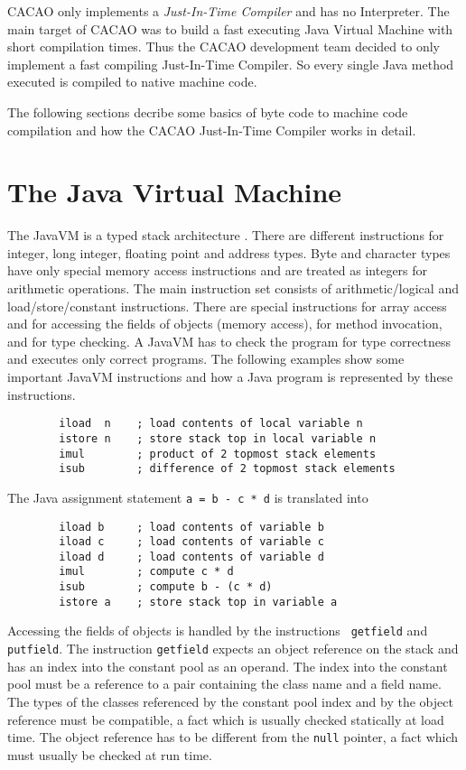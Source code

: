 CACAO only implements a \textit{Just-In-Time Compiler} and has no
Interpreter. The main target of CACAO was to build a fast executing
Java Virtual Machine with short compilation times. Thus the CACAO
development team decided to only implement a fast compiling
Just-In-Time Compiler. So every single Java method executed is
compiled to native machine code.

The following sections decribe some basics of byte code to machine
code compilation and how the CACAO Just-In-Time Compiler works in
detail.


\section{The Java Virtual Machine}

The JavaVM is a typed stack architecture \cite{javavm96}. There are
different instructions for integer, long integer, floating point and
address types. Byte and character types have only special memory access
instructions and are treated as integers for arithmetic operations. The
main instruction set consists of arithmetic/logical and load/store/constant
instructions. There are special instructions for array access and for
accessing the fields of objects (memory access), for method invocation,
and  for type checking. A JavaVM has to check the program for type
correctness and executes only correct programs. The following examples show
some important JavaVM instructions and how a Java program is represented by
these instructions.

\begin{verbatim}
        iload  n    ; load contents of local variable n
        istore n    ; store stack top in local variable n
        imul        ; product of 2 topmost stack elements
        isub        ; difference of 2 topmost stack elements
\end{verbatim} 

The Java assignment statement {\tt a = b - c * d} is translated into

\begin{verbatim}
        iload b     ; load contents of variable b
        iload c     ; load contents of variable c
        iload d     ; load contents of variable d
        imul        ; compute c * d
        isub        ; compute b - (c * d)
        istore a    ; store stack top in variable a
\end{verbatim} 

Accessing the fields of objects is handled by the instructions {\tt
getfield} and {\tt putfield}. The instruction {\tt getfield} expects an
object reference on the stack and has an index into the constant pool as an
operand. The index into the constant pool must be a reference to a pair
containing the class name and a field name. The types of the classes
referenced by the constant pool index and by the object reference must be
compatible, a fact which is usually checked statically at load time. The
object reference has to be different from the {\tt null} pointer, a fact
which must usually be checked at run time.

